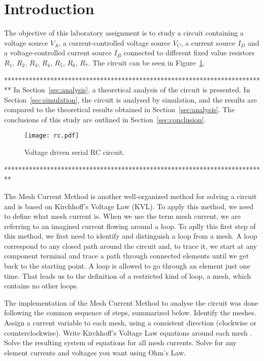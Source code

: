 \section{Introduction}
\label{sec:introduction}

The objective of this laboratory assignment is to study a circuit containing a voltage source $V_A$, a current-controlled voltage source $V_C$, a current source $I_D$ and a voltage-controlled current source $I_B$ connected to different fixed value resistors $R_1$, $R_2$, $R_3$, $R_4$, $R_5$, $R_6$, $R_7$. The circuit can be seen in Figure~\ref{fig:rc}.

**************************************************************************
In Section~\ref{sec:analysis}, a theoretical analysis of the circuit is
presented. In Section~\ref{sec:simulation}, the circuit is analysed by
simulation, and the results are compared to the theoretical results obtained in
Section~\ref{sec:analysis}. The conclusions of this study are outlined in
Section~\ref{sec:conclusion}.

\begin{figure}[h] \centering
\texttt{[image: rc.pdf]}
\caption{Voltage driven serial RC circuit.}
\label{fig:rc}
\end{figure}
**************************************************************************

The Mesh Current Method is another well-organized method for solving a circuit and is based on Kirchhoff's Voltage Law (KVL). To apply this method, we need to define what mesh current is. When we use the term mesh current, we are referring to an imagined current flowing around a loop. To aplly this first step of this method, we first need to identify and distinguish a loop from a mesh. A loop correspond to any closed path around the circuit and, to trace it, we start at any component terminal and trace a path through connected elements until we get back to the starting point. A loop is allowed to go through an element just one time. That leads us to the definition of a restricted kind of loop, a mesh, which contains no other loops.

The implementation of the Mesh Current Method to analyse the circuit was done following the common sequence of steps, summarized below.
    Identify the meshes.
    Assign a current variable to each mesh, using a consistent direction (clockwise or counterclockwise).
    Write Kirchhoff's Voltage Law equations around each mesh .
    Solve the resulting system of equations for all mesh currents.
    Solve for any element currents and voltages you want using Ohm's Law.

